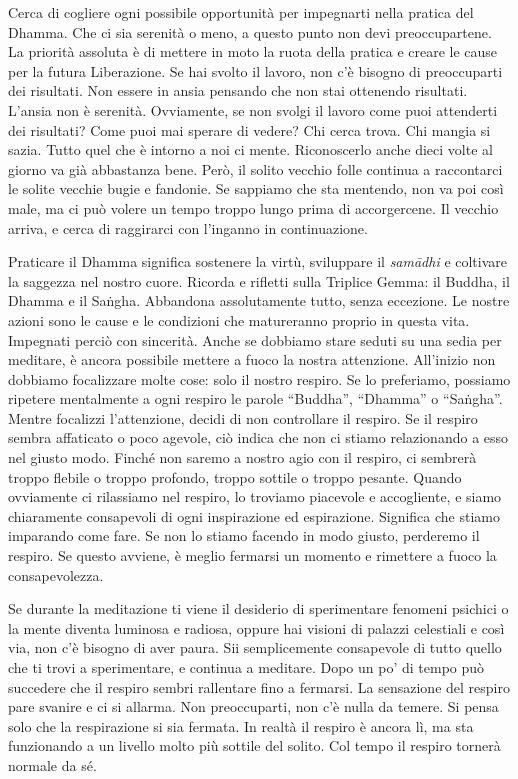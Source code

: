 Cerca di cogliere ogni possibile opportunità per impegnarti nella
pratica del Dhamma. Che ci sia serenità o meno, a questo punto non devi
preoccupartene. La priorità assoluta è di mettere in moto la ruota della
pratica e creare le cause per la futura Liberazione. Se hai svolto il
lavoro, non c'è bisogno di preoccuparti dei risultati. Non essere in
ansia pensando che non stai ottenendo risultati. L'ansia non è serenità.
Ovviamente, se non svolgi il lavoro come puoi attenderti dei risultati?
Come puoi mai sperare di vedere? Chi cerca trova. Chi mangia si sazia.
Tutto quel che è intorno a noi ci mente. Riconoscerlo anche dieci volte
al giorno va già abbastanza bene. Però, il solito vecchio folle continua
a raccontarci le solite vecchie bugie e fandonie. Se sappiamo che sta
mentendo, non va poi così male, ma ci può volere un tempo troppo lungo
prima di accorgercene. Il vecchio arriva, e cerca di raggirarci con
l'inganno in continuazione.

Praticare il Dhamma significa sostenere la virtù, sviluppare il
\emph{samādhi} e coltivare la saggezza nel nostro cuore. Ricorda e
rifletti sulla Triplice Gemma: il Buddha, il Dhamma e il Saṅgha.
Abbandona assolutamente tutto, senza eccezione. Le nostre azioni sono le
cause e le condizioni che matureranno proprio in questa vita. Impegnati
perciò con sincerità. Anche se dobbiamo stare seduti su una sedia per
meditare, è ancora possibile mettere a fuoco la nostra attenzione.
All'inizio non dobbiamo focalizzare molte cose: solo il nostro respiro.
Se lo preferiamo, possiamo ripetere mentalmente a ogni respiro le parole
``Buddha'', ``Dhamma'' o ``Saṅgha''. Mentre focalizzi l'attenzione,
decidi di non controllare il respiro. Se il respiro sembra affaticato o
poco agevole, ciò indica che non ci stiamo relazionando a esso nel
giusto modo. Finché non saremo a nostro agio con il respiro, ci sembrerà
troppo flebile o troppo profondo, troppo sottile o troppo pesante.
Quando ovviamente ci rilassiamo nel respiro, lo troviamo piacevole e
accogliente, e siamo chiaramente consapevoli di ogni inspirazione ed
espirazione. Significa che stiamo imparando come fare. Se non lo stiamo
facendo in modo giusto, perderemo il respiro. Se questo avviene, è
meglio fermarsi un momento e rimettere a fuoco la consapevolezza.

Se durante la meditazione ti viene il desiderio di sperimentare fenomeni
psichici o la mente diventa luminosa e radiosa, oppure hai visioni di
palazzi celestiali e così via, non c'è bisogno di aver paura. Sii
semplicemente consapevole di tutto quello che ti trovi a sperimentare, e
continua a meditare. Dopo un po' di tempo può succedere che il respiro
sembri rallentare fino a fermarsi. La sensazione del respiro pare
svanire e ci si allarma. Non preoccuparti, non c'è nulla da temere. Si
pensa solo che la respirazione si sia fermata. In realtà il respiro è
ancora lì, ma sta funzionando a un livello molto più sottile del solito.
Col tempo il respiro tornerà normale da sé.

